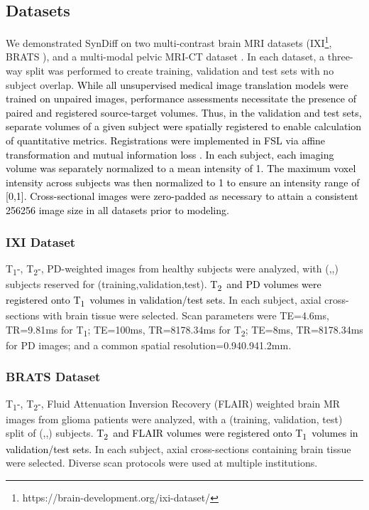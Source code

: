 \documentclass[journal,twoside,web]{ieeecolor}
\newcommand{\Tone}{T\textsubscript{1}}
\newcommand{\Ttwo}{T\textsubscript{2}}
\newcommand*{\revhl}{\textcolor{black}}
\begin{document}
\subsection{Datasets}  
We demonstrated SynDiff on two multi-contrast brain MRI datasets (IXI\footnote{https://brain-development.org/ixi-dataset/}, BRATS \cite{brats_1}), and a multi-modal pelvic MRI-CT dataset \cite{mr_ct_dataset}. In each dataset, a three-way split was performed to create training, validation and test sets with no subject overlap. \revhl{While all unsupervised medical image translation models were trained on unpaired images, performance assessments necessitate the presence of paired and registered source-target volumes. Thus, in the validation and test sets, separate volumes of a given subject were spatially registered to enable calculation of quantitative metrics. Registrations were implemented in FSL via affine transformation and mutual information loss \cite{fslcitation}. In each subject, each imaging volume was separately normalized to a mean intensity of 1. The maximum voxel intensity across subjects was then normalized to 1 to ensure an intensity range of [0,1]. Cross-sectional images were zero-padded as necessary to attain a consistent 256256 image size in all datasets prior to modeling.}

\subsubsection{IXI Dataset} \Tone-, \Ttwo-, PD-weighted images from  healthy subjects were analyzed, with (,,) subjects reserved for (training,validation,test). \revhl{\Ttwo~and PD volumes were registered onto \Tone~volumes in validation/test sets.} In each subject,  axial cross-sections with brain tissue were selected. Scan parameters were TE=4.6ms, TR=9.81ms for \Tone; TE=100ms, TR=8178.34ms for \Ttwo; TE=8ms, TR=8178.34ms for PD images; and a common spatial resolution=0.940.941.2mm.


\subsubsection{BRATS Dataset} \Tone-, \Ttwo-, Fluid Attenuation Inversion Recovery (FLAIR) weighted brain MR images from  glioma patients were analyzed, with a (training, validation, test) split of (,,) subjects. \revhl{\Ttwo~and FLAIR volumes were registered onto \Tone~volumes in validation/test sets.} In each subject,  axial cross-sections containing brain tissue were selected. Diverse scan protocols were used at multiple institutions. 
\end{document}

